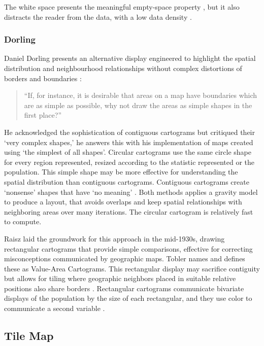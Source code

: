 \documentclass{monashthesis}
\begin{document}
The white space presents the meaningful empty-space property \autocite{ECGC}, \autocite{NAC} but it also distracts the reader from the data, with a low data density \autocite{TVDQI}.

\hypertarget{dorling}{%
\subsubsection{Dorling}\label{dorling}}

Daniel Dorling presents an alternative display engineered to highlight the spatial distribution and neighbourhood relationships without complex distortions of borders and boundaries \autocite{ACTUC}:

\begin{quote}
``If, for instance, it is desirable that areas on a map have boundaries which are as simple as possible, why not draw the areas as simple shapes in the first place?''
\end{quote}

He acknowledged the sophistication of contiguous cartograms but critiqued their `very complex shapes,' he answers this with his implementation of maps created using `the simplest of all shapes'. Circular cartograms use the same circle shape for every region represented, resized according to the statistic represented or the population. This simple shape may be more effective for understanding the spatial distribution than contiguous cartograms. Contiguous cartograms create `nonsense' shapes that have `no meaning' \autocite{NISCC}. Both methods applies a gravity model to produce a layout, that avoids overlaps and keep spatial relationships with neighboring areas over many iterations. The circular cartogram is relatively fast to compute.

Raisz \autocite{RSCW} laid the groundwork for this approach in the mid-1930s, drawing rectangular cartograms that provide simple comparisons, effective for correcting misconceptions communicated by geographic maps. Tobler \autocite{TFYCC} names and defines these as Value-Area Cartograms. This rectangular display may sacrifice contiguity but allows for tiling where geographic neighbors placed in suitable relative positions also share borders \autocite{CDWCS}. Rectangular cartograms communicate bivariate displays of the population by the size of each rectangular, and they use color to communicate a second variable \autocite{ORC}.

\hypertarget{tile-map}{%
\subsection{Tile Map}\label{tile-map}}
\end{document}
